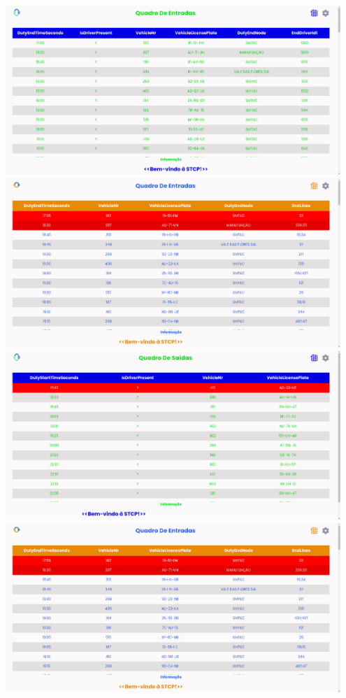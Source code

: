 \documentclass[10pt]{article}
\begin{document}
        \includegraphics[width=0.95\textwidth]{table_of_entries_stcp1}
        \vfill
        \includegraphics[width=0.95\textwidth]{table_of_entries_stcp2}
        \vfill
        \includegraphics[width=0.95\textwidth]{table_of_exits_stcp1}
        \vfill
        \includegraphics[width=0.95\textwidth]{table_of_entries_stcp2}
\end{document}
